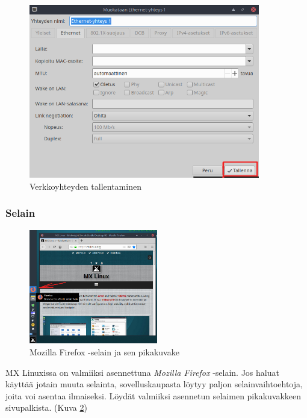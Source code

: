 \documentclass[a4paper, 12pt, finnish]{article}
\begin{document}
\begin{figure}[htpb]
    \begin{center}
        \includegraphics[width=0.899\textwidth]{internet/yhteys_tallenna}
        \caption{Verkkoyhteyden tallentaminen}
        \label{fig:connection}
    \end{center}
\end{figure}

\subsubsection{Selain}
\begin{figure}
  \begin{center}
    \includegraphics[width=0.5\textwidth]{internet/firefox}
  \end{center}
  \vspace*{-3mm}
  \caption{Mozilla Firefox -selain ja sen pikakuvake}
  \label{fig:firefox}
\end{figure}

MX Linuxissa on valmiiksi asennettuna \textit{Mozilla Firefox} -selain. Jos haluat käyttää jotain muuta selainta, sovelluskaupasta löytyy paljon selainvaihtoehtoja, joita voi asentaa ilmaiseksi.
Löydät valmiiksi asennetun selaimen pikakuvakkeen sivupalkista. (Kuva \ref{fig:firefox})
\end{document}
